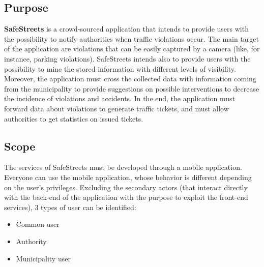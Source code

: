 \documentclass[./main.tex]{subfiles}
\begin{document}
\subsection{Purpose}

\textbf{SafeStreets} is a crowd-sourced application that intends to
provide users with the possibility to notify authorities when traffic
violations occur. The main target of the application are violations that
can be easily captured by a camera (like, for instance, parking
violations). SafeStreets intends also to provide users with the
possibility to mine the stored information with different levels of
visibility. Moreover, the application must cross the collected data with
information coming from the municipality to provide suggestions on
possible interventions to decrease the incidence of violations and
accidents. In the end, the application must forward data about
violations to generate traffic tickets, and must allow authorities to
get statistics on issued tickets.

\subsection{Scope}

The services of SafeStreets must be developed through a mobile application.
Everyone can use the mobile application, whose behavior is different depending
on the user's privileges. Excluding the secondary actors (that interact
directly with the back-end of the application with the purpose to exploit the
front-end services), 3 types of user can be identified:

\begin{itemize}
	\item Common user
	\item Authority
	\item Municipality user
\end{itemize}
\end{document}
